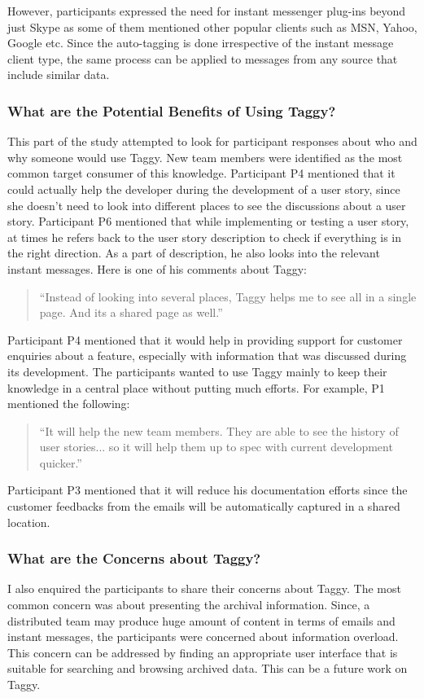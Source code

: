 However, participants expressed the need for instant messenger plug-ins beyond just Skype as some of them mentioned other popular clients such as MSN, Yahoo, Google etc. Since the auto-tagging is done irrespective of the instant message client type, the same process can be applied to messages from any source that include similar data.

\subsubsection{What are the Potential Benefits of Using Taggy?}
This part of the study attempted to look for participant responses about who and why someone would use Taggy. New team members were identified as the most common target consumer of this knowledge. Participant P4 mentioned that it could actually help the developer during the development of a user story, since she doesn't need to look into different places to see the discussions about a user story. Participant P6 mentioned that while implementing or testing a user story, at times he refers back to the user story description to check if everything is in the right direction. As a part of description, he also looks into the relevant instant messages. Here is one of his comments about Taggy:
\begin{quote}
	``Instead of looking into several places, Taggy helps me to see all in a single page. And its a shared page as well.''
\end{quote}

Participant P4 mentioned that it would help in providing support for customer enquiries about a feature, especially with information that was discussed during its development. The participants wanted to use Taggy mainly to keep their knowledge in a central place without putting much efforts. For example, P1 mentioned the following:
\begin{quote}
	``It will help the new team members. They are able to see the history of user stories... so it will help them up to spec with current development quicker.''
\end{quote}
Participant P3 mentioned that it will reduce his documentation efforts since the customer feedbacks from the emails will be automatically captured in a shared location.

\subsubsection{What are the Concerns about Taggy?}
I also enquired the participants to share their concerns about Taggy. The most common concern was about presenting the archival information. Since, a distributed team may produce huge amount of content in terms of emails and instant messages, the participants were concerned about information overload. This concern can be addressed by finding an appropriate user interface that is suitable for searching and browsing archived data. This can be a future work on Taggy.

